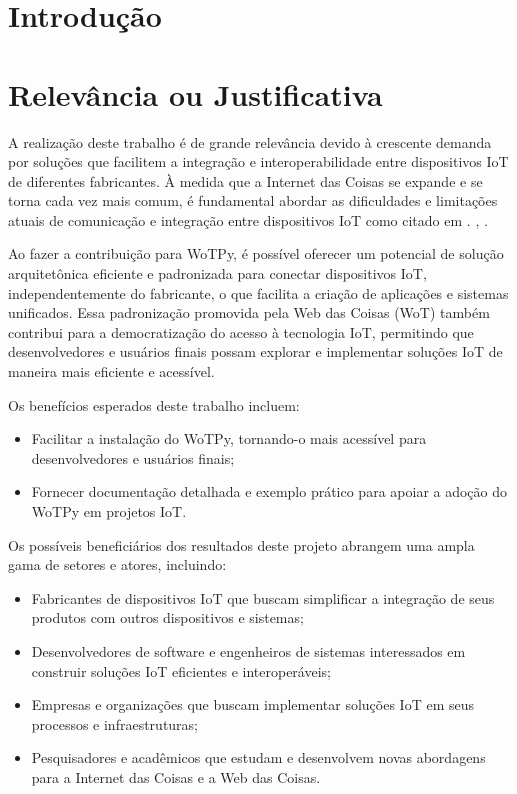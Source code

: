 \chapter{Introdução}

\chapter{Relevância ou Justificativa}


A realização deste trabalho é de grande relevância devido à crescente demanda por soluções que facilitem a integração e interoperabilidade entre dispositivos IoT de diferentes fabricantes. À medida que a Internet das Coisas se expande e se torna cada vez mais comum, é fundamental abordar as dificuldades e limitações atuais de comunicação e integração entre dispositivos IoT como citado em \cite{Stirbu2008} \cite{Gyrard2017}. \cite{GARCIAMANGAS2019235}, \cite{OpenApíWoT2021}.

Ao fazer a contribuição para WoTPy, é possível oferecer um potencial de solução arquitetônica eficiente e padronizada para conectar dispositivos IoT, independentemente do fabricante, o que facilita a criação de aplicações e sistemas unificados. Essa padronização promovida pela Web das Coisas (WoT) também contribui para a democratização do acesso à tecnologia IoT, permitindo que desenvolvedores e usuários finais possam explorar e implementar soluções IoT de maneira mais eficiente e acessível.

Os benefícios esperados deste trabalho incluem:

\begin{itemize}
    \item Facilitar a instalação do WoTPy, tornando-o mais acessível para desenvolvedores e usuários finais;
    \item Fornecer documentação detalhada e exemplo prático para apoiar a adoção do WoTPy em projetos IoT.
\end{itemize}

Os possíveis beneficiários dos resultados deste projeto abrangem uma ampla gama de setores e atores, incluindo:

\begin{itemize}
    \item Fabricantes de dispositivos IoT que buscam simplificar a integração de seus produtos com outros dispositivos e sistemas;
    \item Desenvolvedores de software e engenheiros de sistemas interessados em construir soluções IoT eficientes e interoperáveis;
    \item Empresas e organizações que buscam implementar soluções IoT em seus processos e infraestruturas;
    \item Pesquisadores e acadêmicos que estudam e desenvolvem novas abordagens para a Internet das Coisas e a Web das Coisas.
\end{itemize}

